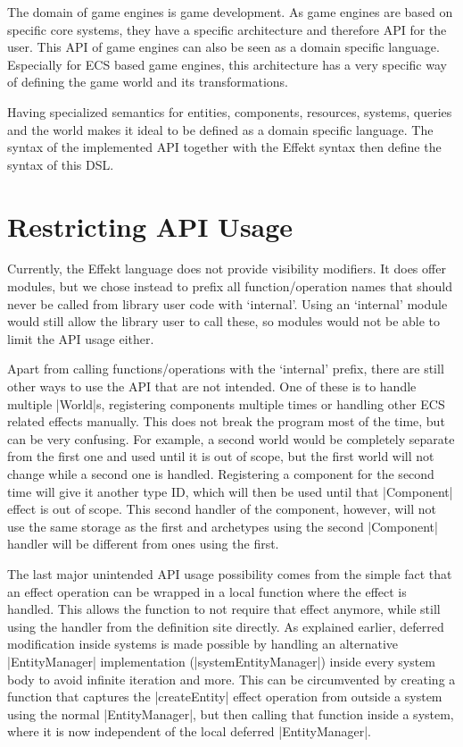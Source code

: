The domain of game engines is game development. As game engines are based on specific core systems, they have a specific architecture and therefore API for the user. This API of game engines can also be seen as a domain specific language. Especially for ECS based game engines, this architecture has a very specific way of defining the game world and its transformations.

Having specialized semantics for entities, components, resources, systems, queries and the world makes it ideal to be defined as a domain specific language. The syntax of the implemented API together with the Effekt syntax then define the syntax of this DSL.

\section{Restricting API Usage}

Currently, the Effekt language does not provide visibility modifiers. It does offer modules, but we chose instead to prefix all function/operation names that should never be called from library user code with `internal'. Using an `internal' module would still allow the library user to call these, so modules would not be able to limit the API usage either.

Apart from calling functions/operations with the `internal' prefix, there are still other ways to use the API that are not intended. One of these is to handle multiple |World|s, registering components multiple times or handling other ECS related effects manually. This does not break the program most of the time, but can be very confusing. For example, a second world would be completely separate from the first one and used until it is out of scope, but the first world will not change while a second one is handled. Registering a component for the second time will give it another type ID, which will then be used until that |Component| effect is out of scope. This second handler of the component, however, will not use the same storage as the first and archetypes using the second |Component| handler will be different from ones using the first.

The last major unintended API usage possibility comes from the simple fact that an effect operation can be wrapped in a local function where the effect is handled. This allows the function to not require that effect anymore, while still using the handler from the definition site directly. As explained earlier, deferred modification inside systems is made possible by handling an alternative |EntityManager| implementation (|systemEntityManager|) inside every system body to avoid infinite iteration and more. This can be circumvented by creating a function that captures the |createEntity| effect operation from outside a system using the normal |EntityManager|, but then calling that function inside a system, where it is now independent of the local deferred |EntityManager|.

